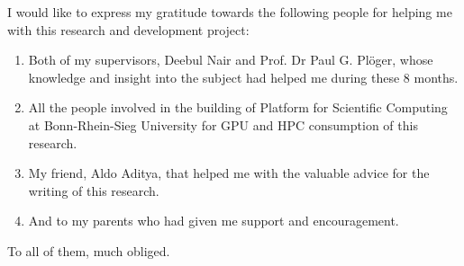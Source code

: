 

    \begin{acknowledgements}
        I would like to express my gratitude towards the following people for helping me with this research and development project:
        \begin{enumerate}
        	\item Both of my supervisors, Deebul Nair and Prof. Dr Paul G. Pl{\"o}ger, whose knowledge and insight into the subject had helped me during these 8 months.
        	\item All the people involved in the building of Platform for Scientific Computing at Bonn-Rhein-Sieg University for GPU and HPC consumption of this research.
        	\item My friend, Aldo Aditya, that helped me with the valuable advice for the writing of this research.
        	\item And to my parents who had given me support and encouragement.
        \end{enumerate}
        To all of them, much obliged.
    \end{acknowledgements}

